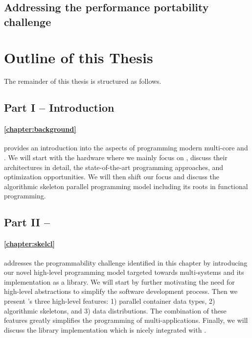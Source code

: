 \subsection*{Addressing the performance portability challenge}

\section{Outline of this Thesis}
The remainder of this thesis is structured as follows.

\subsection*{Part I -- Introduction}

\paragraph{\autoref{chapter:background}} provides an introduction into the aspects of programming modern multi-core \CPUs and \GPUs.
We will start with the hardware where we mainly focus on \GPUs, discuss their architectures in detail, the state-of-the-art programming approaches, and optimization opportunities.
We will then shift our focus and discuss the algorithmic skeleton parallel programming model including its roots in functional programming.


\subsection*{Part II -- \SkelCL}

\paragraph{\autoref{chapter:skelcl}} addresses the programmability challenge identified in this chapter by introducing our novel \SkelCL high-level programming model targeted towards multi-\GPU systems and its implementation as a \Cpp library.
We will start by further motivating the need for high-level abstractions to simplify the software development process.
Then we present \SkelCL's three high-level features:
1) parallel container data types, 2) algorithmic skeletons, and 3) data distributions.
The combination of these features greatly simplifies the programming of multi-\GPU applications.
Finally, we will discuss the \SkelCL library implementation which is nicely integrated with \Cpp.


